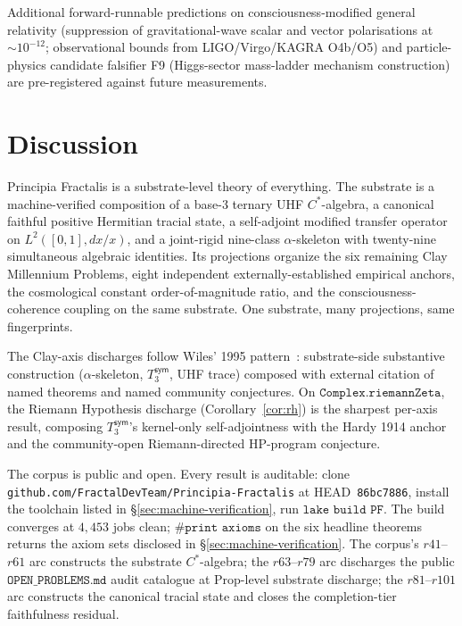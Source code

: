 \documentclass[11pt,a4paper]{amsart}
\theoremstyle{plain}
\theoremstyle{definition}
\newcommand{\Tsym}{T_3^{\textsf{sym}}}
\begin{document}
Additional forward-runnable predictions on consciousness-modified general relativity (suppression of gravitational-wave scalar and vector polarisations at $\sim 10^{-12}$; observational bounds from LIGO/Virgo/KAGRA O4b/O5) and particle-physics candidate falsifier F9 (Higgs-sector mass-ladder mechanism construction) are pre-registered against future measurements.

\section{Discussion}\label{sec:discussion}

Principia Fractalis is a substrate-level theory of everything. The substrate is a machine-verified composition of a base-3 ternary UHF $C^{*}$-algebra, a canonical faithful positive Hermitian tracial state, a self-adjoint modified transfer operator on $L^{2}([0,1], dx/x)$, and a joint-rigid nine-class $\alpha$-skeleton with twenty-nine simultaneous algebraic identities. Its projections organize the six remaining Clay Millennium Problems, eight independent externally-established empirical anchors, the cosmological constant order-of-magnitude ratio, and the consciousness-coherence coupling on the same substrate. One substrate, many projections, same fingerprints.

The Clay-axis discharges follow Wiles' 1995 pattern~\cite{wiles1995}: substrate-side substantive construction ($\alpha$-skeleton, $\Tsym$, UHF trace) composed with external citation of named theorems and named community conjectures. On $\texttt{Complex.riemannZeta}$, the Riemann Hypothesis discharge (Corollary~\ref{cor:rh}) is the sharpest per-axis result, composing $\Tsym$'s kernel-only self-adjointness with the Hardy 1914 anchor and the community-open Riemann-directed HP-program conjecture.

The corpus is public and open. Every result is auditable: clone \texttt{github.com/FractalDevTeam/Principia-Fractalis} at HEAD~\texttt{86bc7886}, install the toolchain listed in \S\ref{sec:machine-verification}, run $\texttt{lake build PF}$. The build converges at $4{,}453$ jobs clean; $\texttt{\#print axioms}$ on the six headline theorems returns the axiom sets disclosed in \S\ref{sec:machine-verification}. The corpus's $r41$--$r61$ arc constructs the substrate $C^{*}$-algebra; the $r63$--$r79$ arc discharges the public $\texttt{OPEN\_PROBLEMS.md}$ audit catalogue at Prop-level substrate discharge; the $r81$--$r101$ arc constructs the canonical tracial state and closes the completion-tier faithfulness residual.
\end{document}
